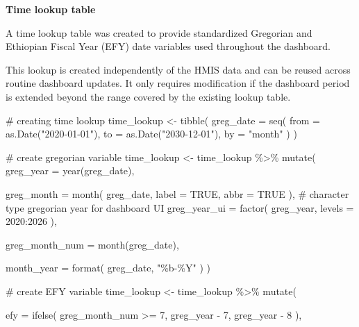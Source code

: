 \documentclass[
  letterpaper,
  DIV=11,
  numbers=noendperiod]{scrartcl}
\newenvironment{Shaded}{\begin{snugshade}}{\end{snugshade}}
\newcommand{\AttributeTok}[1]{\textcolor[rgb]{0.40,0.45,0.13}{#1}}
\newcommand{\CommentTok}[1]{\textcolor[rgb]{0.37,0.37,0.37}{#1}}
\newcommand{\ConstantTok}[1]{\textcolor[rgb]{0.56,0.35,0.01}{#1}}
\newcommand{\DecValTok}[1]{\textcolor[rgb]{0.68,0.00,0.00}{#1}}
\newcommand{\FunctionTok}[1]{\textcolor[rgb]{0.28,0.35,0.67}{#1}}
\newcommand{\NormalTok}[1]{\textcolor[rgb]{0.00,0.23,0.31}{#1}}
\newcommand{\OtherTok}[1]{\textcolor[rgb]{0.00,0.23,0.31}{#1}}
\newcommand{\SpecialCharTok}[1]{\textcolor[rgb]{0.37,0.37,0.37}{#1}}
\newcommand{\StringTok}[1]{\textcolor[rgb]{0.13,0.47,0.30}{#1}}
\begin{document}
\textbf{Time lookup table}

A time lookup table was created to provide standardized Gregorian and
Ethiopian Fiscal Year (EFY) date variables used throughout the
dashboard.

This lookup is created independently of the HMIS data and can be reused
across routine dashboard updates. It only requires modification if the
dashboard period is extended beyond the range covered by the existing
lookup table.

\begin{Shaded}
\begin{Highlighting}[]
\CommentTok{\# creating time lookup}
\NormalTok{time\_lookup }\OtherTok{\textless{}{-}} \FunctionTok{tibble}\NormalTok{(}
  \AttributeTok{greg\_date =} \FunctionTok{seq}\NormalTok{(}
    \AttributeTok{from =} \FunctionTok{as.Date}\NormalTok{(}\StringTok{"2020{-}01{-}01"}\NormalTok{),}
    \AttributeTok{to =} \FunctionTok{as.Date}\NormalTok{(}\StringTok{"2030{-}12{-}01"}\NormalTok{),}
    \AttributeTok{by =} \StringTok{"month"}
\NormalTok{  )}
\NormalTok{)}

\CommentTok{\# create gregorian variable}
\NormalTok{time\_lookup }\OtherTok{\textless{}{-}}\NormalTok{ time\_lookup }\SpecialCharTok{\%\textgreater{}\%}
  \FunctionTok{mutate}\NormalTok{(}
    \AttributeTok{greg\_year =} \FunctionTok{year}\NormalTok{(greg\_date),}
    
    \AttributeTok{greg\_month =} \FunctionTok{month}\NormalTok{(}
\NormalTok{      greg\_date,}
      \AttributeTok{label =} \ConstantTok{TRUE}\NormalTok{,}
      \AttributeTok{abbr =} \ConstantTok{TRUE}
\NormalTok{    ),}
    \CommentTok{\# character type gregorian year for dashboard UI}
   \AttributeTok{greg\_year\_ui =} \FunctionTok{factor}\NormalTok{(}
\NormalTok{        greg\_year,}
        \AttributeTok{levels =} \DecValTok{2020}\SpecialCharTok{:}\DecValTok{2026}
\NormalTok{      ),}
    
    \AttributeTok{greg\_month\_num =} \FunctionTok{month}\NormalTok{(greg\_date),}
    
    \AttributeTok{month\_year =} \FunctionTok{format}\NormalTok{(}
\NormalTok{      greg\_date,}
      \StringTok{"\%b{-}\%Y"}
\NormalTok{    )}
\NormalTok{  )}

\CommentTok{\# create EFY variable}
\NormalTok{time\_lookup }\OtherTok{\textless{}{-}}\NormalTok{ time\_lookup }\SpecialCharTok{\%\textgreater{}\%}
  \FunctionTok{mutate}\NormalTok{(}
    
    \AttributeTok{efy =} \FunctionTok{ifelse}\NormalTok{(}
\NormalTok{      greg\_month\_num }\SpecialCharTok{\textgreater{}=} \DecValTok{7}\NormalTok{,}
\NormalTok{      greg\_year }\SpecialCharTok{{-}} \DecValTok{7}\NormalTok{,}
\NormalTok{      greg\_year }\SpecialCharTok{{-}} \DecValTok{8}
\NormalTok{    ),}
    

\end{Highlighting}
\end{Shaded}
\end{document}
